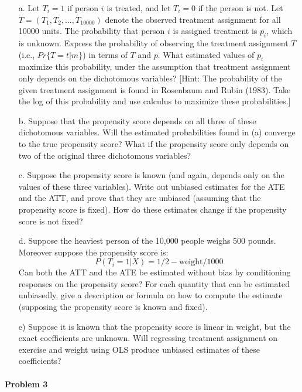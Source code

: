 \documentclass{article}
\begin{document}
  \begin{itemize}
  \item[a.] Let $T_i = 1$ if person $i$ is treated, and let $T_i = 0$
    if the person is not.  Let $T = (T_1,T_2,\ldots,T_{10000})$ denote
    the observed treatment assignment for all 10000 units.  The
    probability that person $i$ is assigned treatment is $p_i$, which
    is unknown.  Express the probability of observing the treatment
    assignment $T$ (i.e., $Pr\{T=t | m\}$) in terms of $T$ and $p$.
    What estimated values of $p_i$ maximize this probability, under
    the assumption that treatment assignment only depends on the
    dichotomous variables?  [Hint: The probability of the given
    treatment assignment is found in Rosenbaum and Rubin (1983).  Take the log of this probability and use calculus to
    maximize these probabilities.]
    \item[b.]  
      Suppose that the propensity score depends on all three of these dichotomous
      variables.  
      Will the estimated probabilities found in (a) converge to the true propensity score?
      What if the propensity score only depends on two of the
      original three dichotomous variables?
    \item[c.]
      Suppose the propensity score is known (and again, depends only on the values of 
      these three variables).  
      Write out unbiased estimates for the ATE and the ATT, 
      and prove that they are unbiased (assuming that the propensity score is fixed).
      How do these estimates change if the propensity score is not fixed? 
    \item[d.]
      Suppose the heaviest person of the 10,000 people weighs 500 pounds.
      Moreover suppose the propensity score is:
      $$
        P(T_i =1 | X) = 1/2 - 
        \text{weight}/1000
      $$
      Can both the ATT and the ATE be estimated without bias by
      conditioning responses on the propensity score?  
      For each quantity that can be estimated unbiasedly, 
      give a description or formula on how to compute the estimate (supposing the
      propensity score is known and fixed).
    \item[e)]
      Suppose it is known that the propensity score is linear 
      in weight, but the exact coefficients are unknown.
      Will regressing treatment assignment on 
      exercise and weight using OLS produce unbiased estimates of these coefficients?      
  \end{itemize}


\paragraph{Problem 3}
\end{document}
